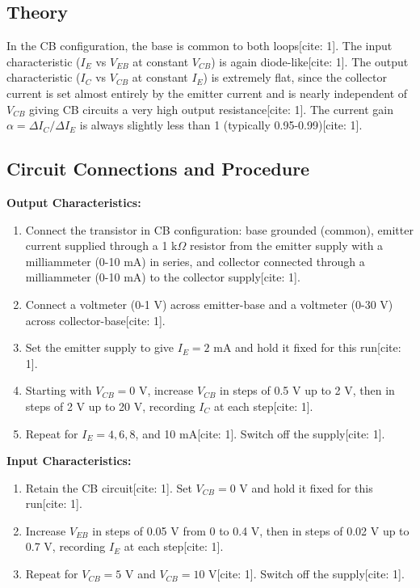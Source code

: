 \documentclass[12pt,a4paper]{article}
\begin{document}
\subsection{Theory}
In the CB configuration, the base is common to both loops[cite: 1]. The input characteristic ($I_E$ vs $V_{EB}$ at constant $V_{CB}$) is again diode-like[cite: 1]. The output characteristic ($I_C$ vs $V_{CB}$ at constant $I_E$) is extremely flat, since the collector current is set almost entirely by the emitter current and is nearly independent of $V_{CB}$ giving CB circuits a very high output resistance[cite: 1]. The current gain $\alpha=\Delta I_C/\Delta I_E$ is always slightly less than 1 (typically 0.95-0.99)[cite: 1].

\subsection{Circuit Connections and Procedure}
\textbf{Output Characteristics:}
\begin{enumerate}
    \item Connect the transistor in CB configuration: base grounded (common), emitter current supplied through a 1 k$\Omega$ resistor from the emitter supply with a milliammeter (0-10 mA) in series, and collector connected through a milliammeter (0-10 mA) to the collector supply[cite: 1].
    \item Connect a voltmeter (0-1 V) across emitter-base and a voltmeter (0-30 V) across collector-base[cite: 1].
    \item Set the emitter supply to give $I_E=2$ mA and hold it fixed for this run[cite: 1].
    \item Starting with $V_{CB}=0$ V, increase $V_{CB}$ in steps of 0.5 V up to 2 V, then in steps of 2 V up to 20 V, recording $I_C$ at each step[cite: 1].
    \item Repeat for $I_E=4, 6, 8$, and 10 mA[cite: 1]. Switch off the supply[cite: 1].
\end{enumerate}

\textbf{Input Characteristics:}
\begin{enumerate}
    \item Retain the CB circuit[cite: 1]. Set $V_{CB} = 0$ V and hold it fixed for this run[cite: 1].
    \item Increase $V_{EB}$ in steps of 0.05 V from 0 to 0.4 V, then in steps of 0.02 V up to 0.7 V, recording $I_E$ at each step[cite: 1].
    \item Repeat for $V_{CB}=5$ V and $V_{CB}=10$ V[cite: 1]. Switch off the supply[cite: 1].
\end{enumerate}
\end{document}
